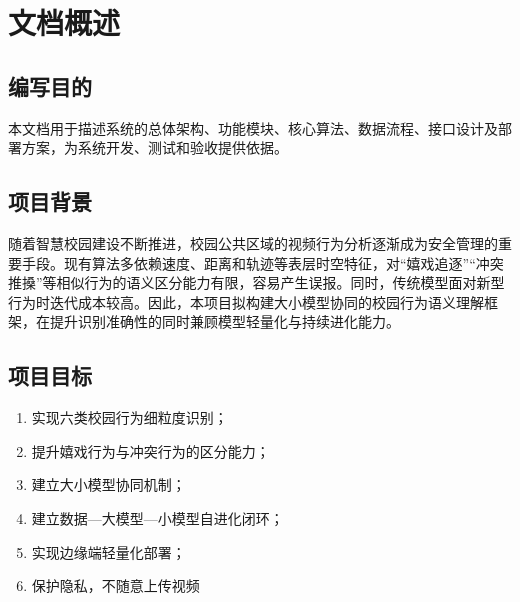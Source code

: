 \chapter{文档概述}

\section{编写目的}

本文档用于描述系统的总体架构、功能模块、核心算法、数据流程、接口设计及部署方案，为系统开发、测试和验收提供依据。

\section{项目背景}

随着智慧校园建设不断推进，校园公共区域的视频行为分析逐渐成为安全管理的重要手段。现有算法多依赖速度、距离和轨迹等表层时空特征，对“嬉戏追逐”“冲突推搡”等相似行为的语义区分能力有限，容易产生误报。同时，传统模型面对新型行为时迭代成本较高。因此，本项目拟构建大小模型协同的校园行为语义理解框架，在提升识别准确性的同时兼顾模型轻量化与持续进化能力。

\section{项目目标}

\begin{enumerate}
\item 实现六类校园行为细粒度识别；
\item 提升嬉戏行为与冲突行为的区分能力；
\item 建立大小模型协同机制；
\item 建立数据—大模型—小模型自进化闭环；
\item 实现边缘端轻量化部署；
\item 保护隐私，不随意上传视频
\end{enumerate}

